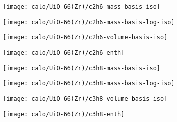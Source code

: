 \begin{figure}[H]

    \begin{subfigure}{0.25\textwidth}
        \texttt{[image: calo/UiO-66(Zr)/c2h6-mass-basis-iso]}%
        \label{appx:fgr:shaping:uio66c2h6mass}
    \end{subfigure}%
    \begin{subfigure}{0.25\textwidth}
        \texttt{[image: calo/UiO-66(Zr)/c2h6-mass-basis-log-iso]}%
        \label{appx:fgr:shaping:uio66c2h6masslog}
    \end{subfigure}%
    \begin{subfigure}{0.25\textwidth}
        \texttt{[image: calo/UiO-66(Zr)/c2h6-volume-basis-iso]}%
        \label{appx:fgr:shaping:uio66c2h6volume}
    \end{subfigure}%
    \begin{subfigure}{0.25\textwidth}
        \texttt{[image: calo/UiO-66(Zr)/c2h6-enth]}%
        \label{appx:fgr:shaping:uio66c2h6enth}%
    \end{subfigure}%

    \begin{subfigure}{0.25\textwidth}
        \texttt{[image: calo/UiO-66(Zr)/c3h8-mass-basis-iso]}%
        \label{appx:fgr:shaping:uio66c3h8mass}
    \end{subfigure}%
    \begin{subfigure}{0.25\textwidth}
        \texttt{[image: calo/UiO-66(Zr)/c3h8-mass-basis-log-iso]}%
        \label{appx:fgr:shaping:uio66c3h8masslog}
    \end{subfigure}%
    \begin{subfigure}{0.25\textwidth}
        \texttt{[image: calo/UiO-66(Zr)/c3h8-volume-basis-iso]}%
        \label{appx:fgr:shaping:uio66c3h8volume}
    \end{subfigure}%
    \begin{subfigure}{0.25\textwidth}
        \texttt{[image: calo/UiO-66(Zr)/c3h8-enth]}%
        \label{appx:fgr:shaping:uio66c3h8enth}%
    \end{subfigure}%


\end{figure}
